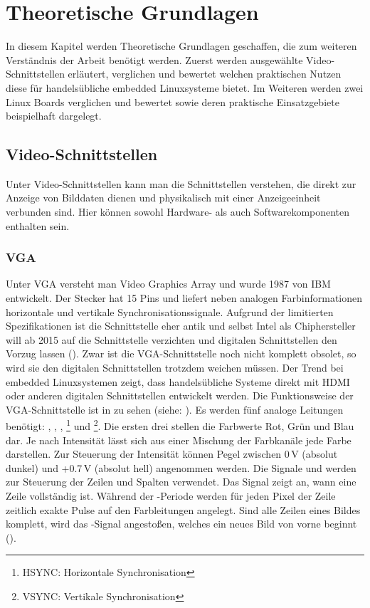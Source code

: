 \chapter{Theoretische Grundlagen}
\label{cha:Grundlagen}
In diesem Kapitel werden Theoretische Grundlagen geschaffen, die zum weiteren Verständnis der Arbeit benötigt werden. Zuerst werden ausgewählte Video-Schnittstellen erläutert, verglichen und bewertet welchen praktischen Nutzen diese für handelsübliche embedded Linuxsysteme bietet. Im Weiteren werden zwei Linux Boards verglichen und bewertet sowie deren praktische Einsatzgebiete beispielhaft dargelegt.

\section{Video-Schnittstellen}
Unter Video-Schnittstellen kann man die Schnittstellen verstehen, die direkt zur Anzeige von Bilddaten dienen und physikalisch mit einer Anzeigeeinheit verbunden sind. Hier können sowohl Hardware- als auch Softwarekomponenten enthalten sein.
\subsection{VGA}
Unter VGA versteht man Video Graphics Array und wurde 1987 von IBM entwickelt. Der Stecker hat 15 Pins und liefert neben analogen Farbinformationen horizontale und vertikale Synchronisationssignale. Aufgrund der limitierten Spezifikationen ist die Schnittstelle eher antik und selbst Intel als Chiphersteller will ab 2015 auf die Schnittstelle verzichten  und digitalen Schnittstellen den Vorzug lassen (\cite{Intel2010}). Zwar ist die VGA-Schnittstelle noch nicht komplett obsolet, so wird sie den digitalen Schnittstellen trotzdem weichen müssen. Der Trend bei embedded Linuxsystemen zeigt, dass handelsübliche Systeme direkt mit HDMI oder anderen digitalen Schnittstellen entwickelt werden.
Die Funktionsweise der VGA-Schnittstelle ist in  zu sehen (siehe: \cite{Valcarce2011}). Es werden fünf analoge Leitungen benötigt: , , , \footnote{HSYNC: Horizontale Synchronisation} und \footnote{VSYNC: Vertikale Synchronisation}. Die ersten drei stellen die Farbwerte Rot, Grün und Blau dar. Je nach Intensität lässt sich aus einer Mischung der Farbkanäle jede Farbe darstellen. Zur Steuerung der Intensität können Pegel zwischen 0\,V (absolut dunkel) und +0.7\,V (absolut hell) angenommen werden. Die Signale  und  werden zur Steuerung der Zeilen und Spalten verwendet. Das Signal  zeigt an, wann eine Zeile vollständig ist. Während der -Periode werden für jeden Pixel der Zeile zeitlich exakte Pulse auf den Farbleitungen angelegt. Sind alle Zeilen eines Bildes komplett, wird das -Signal angestoßen, welches ein neues Bild von vorne beginnt (\cite{Valcarce2011}).

